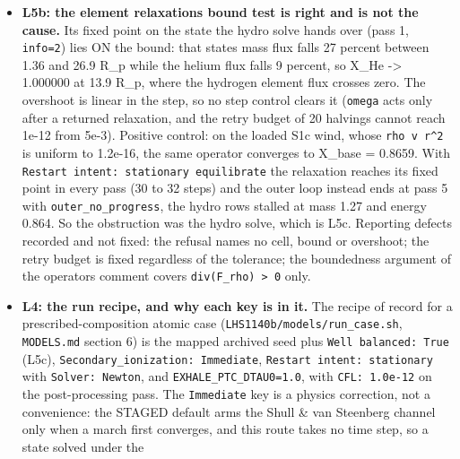 \documentclass[english,a4paper]{my_memo}
\begin{document}
\begin{itemize}
  times F\_wind, whatever the interior velocity, until the column is scaled by
  0.9716; and with the stationary velocity imposed, the DISCRETE energy flux
  divergence at the worst base cells is -1.0 x (heat - cool) where the
  continuum value on the same state is +0.5, which is L5c\textquotesingle s finding reached
  from the other side. Also recorded: \texttt{load\_IC} rebuilds the density from
  \texttt{Ion\_species\_IC.txt} and never from p and T.
\item
  \textbf{L5b: the element relaxation\textquotesingle s bound test is right and is not the cause.}
  Its fixed point on the state the hydro solve hands over (pass 1, \texttt{info=2})
  lies ON the bound: that state\textquotesingle s mass flux falls 27 percent between 1.36 and
  26.9 R\_p while the helium flux falls 9 percent, so X\_He -\textgreater{} 1.000000 at 13.9
  R\_p, where the hydrogen element flux crosses zero. The overshoot is linear
  in the step, so no step control clears it (\texttt{omega} acts only after a
  returned relaxation, and the retry budget of 20 halvings cannot reach 1e-12
  from 5e-3). Positive control: on the loaded S1c wind, whose \texttt{rho\ v\ r\^{}2} is
  uniform to 1.2e-16, the same operator converges to X\_base = 0.8659. With
  \texttt{Restart\ intent:\ stationary\ equilibrate} the relaxation reaches its fixed
  point in every pass (30 to 32 steps) and the outer loop instead ends at
  pass 5 with \texttt{outer\_no\_progress}, the hydro rows stalled at mass 1.27 and
  energy 0.864. So the obstruction was the hydro solve, which is L5c.
  Reporting defects recorded and not fixed: the refusal names no cell, bound
  or overshoot; the retry budget is fixed regardless of the tolerance; the
  boundedness argument of the operator\textquotesingle s comment covers \texttt{div(F\_rho)\ \textgreater{}\ 0}
  only.
\item
  \textbf{L4: the run recipe, and why each key is in it.} The recipe of record for
  a prescribed-composition atomic case (\texttt{LHS1140b/models/run\_case.sh},
  \texttt{MODELS.md} section 6) is the mapped archived seed plus
  \texttt{Well\ balanced:\ True} (L5c), \texttt{Secondary\_ionization:\ Immediate},
  \texttt{Restart\ intent:\ stationary} with \texttt{Solver:\ Newton}, and
  \texttt{EXHALE\_PTC\_DTAU0=1.0}, with \texttt{CFL:\ 1.0e-12} on the post-processing pass.
  The \texttt{Immediate} key is a physics correction, not a convenience: the STAGED
  default arms the Shull \& van Steenberg channel only when a march first
  converges, and this route takes no time step, so a state solved under the

\end{itemize}
\end{document}
